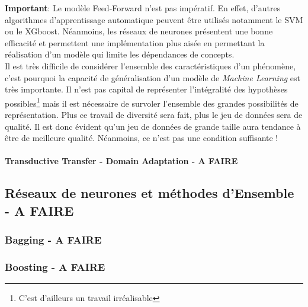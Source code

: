 \noindent \textbf{Important}: Le modèle Feed-Forward n'est pas impératif. En effet, d'autres algorithmes d'apprentissage automatique peuvent être utilisés notamment le SVM ou le XGboost. Néanmoins, les réseaux de neurones présentent une bonne efficacité et permettent une implémentation plus aisée en permettant la réalisation d'un modèle qui limite les dépendances de concepts.\\

\noindent Il est très difficile de considérer l'ensemble des caractéristiques d'un phénomène, c'est pourquoi la capacité de généralisation d'un modèle de \textit{Machine Learning} est très importante. Il n'est pas capital de représenter l'intégralité des hypothèses possibles\footnote{C'est d'ailleurs un travail irréalisable} mais il est nécessaire de survoler l'ensemble des grandes possibilités de représentation. Plus ce travail de diversité sera fait, plus le jeu de données sera de qualité. Il est donc évident qu'un jeu de données de grande taille aura tendance à être de meilleure qualité. Néanmoins, ce n'est pas une condition suffisante !

\paragraph{Transductive Transfer - Domain Adaptation - A FAIRE}
\subsection{Réseaux de neurones et méthodes d'Ensemble - A FAIRE}
\subsubsection{Bagging - A FAIRE}
\subsubsection{Boosting - A FAIRE}
